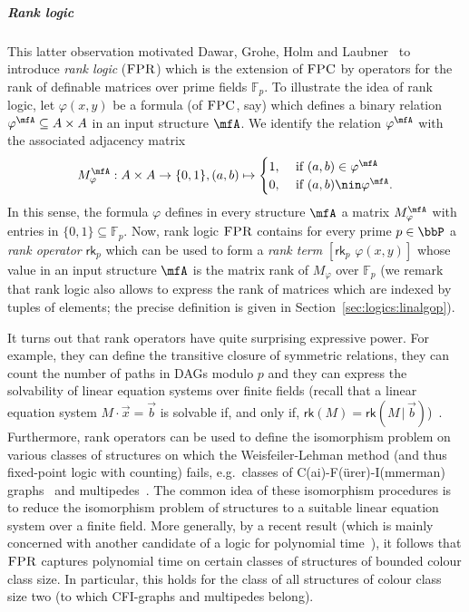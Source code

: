 \documentclass[a4paper,UKenglish]{lipics}
\newcommand{\field}[1]{\mathbb{#1}}
\newcommand{\logic}[1]{\ensuremath{\textsc{#1}}\xspace}
\newcommand{\FPC}{\logic{FPC}}
\newcommand{\FPRK}{\logic{FPR}}
\newcommand{\FPR}{\FPRK}
\newcommand{\rkp}{\ensuremath{\textsf{rk}_p}\xspace}
\newcommand{\rankk}{\ensuremath{\textsf{rk}}\xspace}
\renewcommand{\phi}{\varphi}
\newcommand{\vct}[1]{\vec{#1}}
\theoremstyle{plain}
\begin{document}
\subparagraph*{Rank logic}
This latter observation motivated Dawar, Grohe, Holm and 
Laubner~\cite{DaGrHoLa09} 
to introduce \emph{rank logic} (\FPR) which is the extension of \FPC by 
operators for the rank of definable matrices over prime 
fields $\field F_p$.
To illustrate the idea of rank logic, let
$\phi(x,y)$ be a formula (of $\FPC$, say) which defines a binary 
relation $\phi^\mfA \subseteq A \times A$ in an input structure $\mfA$.
We identify the relation $\phi^\mfA$ with the associated adjacency matrix 
\[ 
M_\phi^\mfA: A \times A \to \{ 0, 1\}, (a,b) \mapsto 
\begin{cases}
 1,& \text{ if } (a,b) \in \phi^\mfA\\
 0, & \text{ if } (a,b) \nin \phi^\mfA.
\end{cases}
\]
In this sense, the formula $\phi$ defines in every structure $\mfA$ a 
matrix $M_\phi^\mfA$ with entries in $\{0,1 \} \subseteq \field F_p$. 
Now, rank logic $\FPR$ contains for every prime 
$p \in \bbP$ a \emph{rank operator} $\rkp$ which can be used to form a 
\emph{rank term} $[ \rkp \,\,\phi(x,y) ]$ whose value in an input structure 
$\mfA$ is 
the matrix rank of $M_\phi$ over $\field F_p$ (we remark that rank logic 
also allows to express the rank of matrices which are indexed by tuples of 
elements; the precise definition is given in Section~\ref{sec:logics:linalgop}).

It turns out that rank operators have quite surprising expressive power. 
For example, they can define the transitive closure of symmetric 
relations, they can count the number of paths in DAGs modulo $p$ and they 
can express the solvability of linear equation systems over finite fields 
(recall that a linear equation system $M \cdot \vct x = \vct b$ is solvable if, 
and only if, $\rankk(M) = \rankk(M \, | \, \vct b)$)~\cite{DaGrHoLa09}. 
Furthermore, rank operators can be used to define the isomorphism problem on
various classes of structures on which the Weisfeiler-Lehman method (and thus 
fixed-point logic with counting) fails, e.g.\ classes of
C(ai)-F(ürer)-I(mmerman) graphs~\cite{CFI92,DaGrHoLa09} and 
multipedes~\cite{GuSh96,Ho10}.
The common idea of these isomorphism procedures is to reduce the isomorphism 
problem of structures to a suitable linear equation system over a finite field.
More generally, by a recent result (which is mainly concerned with another 
candidate of a logic for polynomial time~\cite{AGGP14}), it follows that \FPR 
captures polynomial time on certain classes of structures of bounded colour 
class size. In particular, this holds for the class of all structures of colour 
class size two (to which CFI-graphs and multipedes belong).
\end{document}
